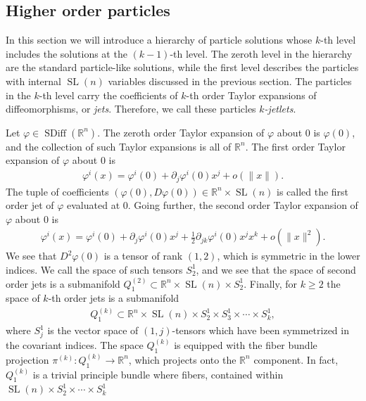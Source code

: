 \documentclass[12pt]{amsart}
\newcommand{\R}{\ensuremath{\mathbb{R}}}
\DeclareMathOperator{\SDiff}{SDiff}
\DeclareMathOperator{\SL}{SL}
\begin{document}
  \subsection{Higher order particles}
  \label{sec:higher_order}
  In this section we will introduce a hierarchy of particle solutions whose $k$-th level includes the solutions at the $(k-1)$-th level.
  The zeroth level in the hierarchy are the standard particle-like solutions,
  while the first level describes the particles with internal $\SL(n)$ variables
  discussed in the previous section.
  The particles in the $k$-th level carry the coefficients of
  $k$-th order Taylor expansions of diffeomorphisms,
  or \emph{jets}.
  Therefore, we call these particles \emph{$k$-jetlets}.

  Let $\varphi \in \SDiff(\R^n)$.
  The zeroth order Taylor expansion of $\varphi$ about $0$
  is $\varphi(0)$, and the collection of such Taylor
  expansions is all of $\R^n$.
  The first order Taylor expansion of $\varphi$ about $0$ is
  \begin{align*}
    \varphi^i( x) = \varphi^i(0) + \partial_j \varphi^i(0) x^j + o( \|x\|).
  \end{align*}
  The tuple of coefficients $(\varphi(0) , D\varphi(0) ) \in \R^n \times \SL(n)$ is
  called the first order jet of $\varphi$ evaluated at $0$.
  Going further, the second order Taylor expansion of $\varphi$ about $0$
  is
  \begin{align*}
    \varphi^i(x) = \varphi^i(0) + \partial_j \varphi^i(0) x^j + 
    \frac{1}{2} \partial_{jk} \varphi^i(0) x^j x^k + o( \| x\|^2).
  \end{align*}
  We see that $D^2\varphi(0)$ is a tensor of rank $(1,2)$, which is
  symmetric in the lower indices.
  We call the space of such tensors $S^1_2$,
  and we see that the space of second order jets is a submanifold $Q^{(2)}_1 \subset \R^n \times \SL(n) \times S^1_2$.
  Finally, for $k \geq 2$ the space of $k$-th order jets is a submanifold
  \begin{align*}
    Q_1^{(k)} \subset \R^n \times \SL(n) \times S^1_2 \times S^1_3 \times \cdots\times S^1_k,
  \end{align*}
  where $S^1_j$ is the vector space of $(1,j)$-tensors which
  have been symmetrized in the covariant indices.
  The space $Q_1^{(k)}$ is equipped with the fiber bundle
  projection $\pi^{(k)} : Q_1^{(k)} \to \R^n$,
  which projects onto the $\R^n$ component.
  In fact, $Q_1^{(k)}$ is a trivial principle bundle
  where fibers, contained within $\SL(n) \times S^1_2 \times \cdots \times S^1_k$
\end{document}
